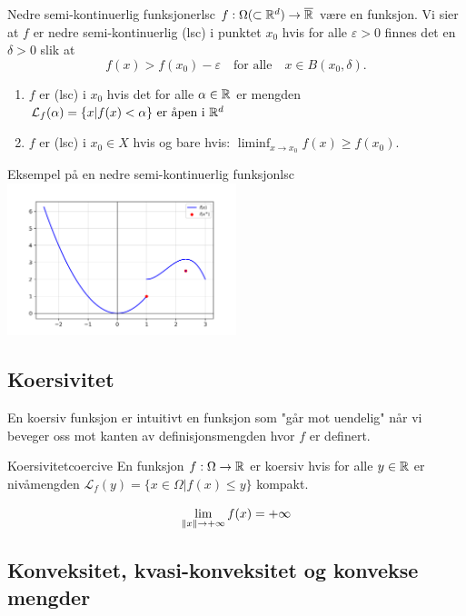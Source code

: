 \begin{definition}{Nedre semi-kontinuerlig funksjoner}{lsc}
	\(f: \Omega (\subset \mathbb{R}^d) \to \overline{\mathbb{R}}\) være en funksjon. Vi sier at \(f\) er nedre semi-kontinuerlig (lsc) i punktet \(x_0\) hvis for alle \(\varepsilon > 0\) finnes det en \(\delta > 0\) slik at
	\[
		f(x) > f(x_0) - \varepsilon \quad \text{for alle} \quad x \in B(x_0, \delta).
	\]
	\begin{enumerate}
		\item \(f\) er (lsc) i \(x_0\) hvis det for alle \(\alpha \in \mathbb{R}\) er mengden \(\mathcal{L}_f(\alpha) = \{x | f(x) < \alpha \} \text{ er åpen i } \mathbb{R}^d\)
		\item \(f\) er (lsc) i \(x_0 \in X\) hvis og bare hvis: \(\liminf_{x \to x_0} f(x) \geq f(x_0)\).
	\end{enumerate}
\end{definition}
\begin{example}{Eksempel på en nedre semi-kontinuerlig funksjon}{lsc}
	\includegraphics[width=0.5\textwidth]{figures/example_lsc.png}
\end{example}

\subsection{Koersivitet}
En koersiv funksjon er intuitivt en funksjon som "går mot uendelig" når vi beveger oss mot kanten av definisjonsmengden hvor \( f \) er definert.

\begin{definition}{Koersivitet}{coercive}
	En funksjon \(f: \Omega \to \mathbb{R}\) er koersiv hvis for alle \(y \in \mathbb{R}\) er nivåmengden \(\mathcal{L}_f(y) = \{x \in \Omega | f(x) \leq y\}\) kompakt.

	\[
		\lim_{\lVert x\rVert \to +\infty} f(x) = +\infty
	\]
\end{definition}

\subsection{Konveksitet, kvasi-konveksitet og konvekse mengder}

